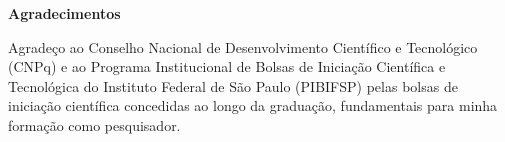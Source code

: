\begin{center}

\textbf{Agradecimentos}
    
\end{center}

Agradeço ao Conselho Nacional de Desenvolvimento Científico e Tecnológico (CNPq) e ao Programa Institucional de Bolsas de Iniciação Científica e Tecnológica do Instituto Federal de São Paulo (PIBIFSP) pelas bolsas de iniciação científica concedidas ao longo da graduação, fundamentais para minha formação como pesquisador.

